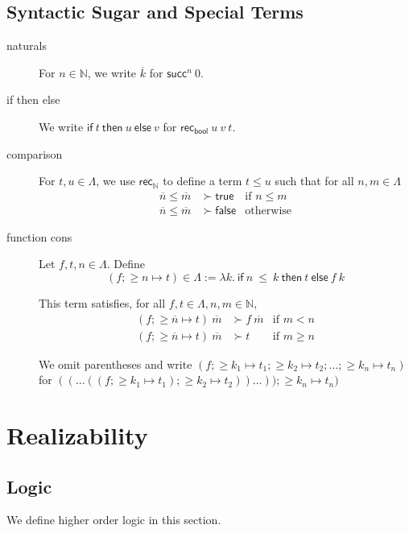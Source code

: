 \documentclass{article}
\newcommand{\successor}{\mathsf{succ}}
\newcommand{\N}{\mathbb{N}}
\newcommand{\recN}{\mathsf{rec}_{\mathbb{N}}}
\newcommand{\true}{\mathsf{true}}
\newcommand{\false}{\mathsf{false}}
\newcommand{\recbool}{\mathsf{rec_{bool}}}
\newcommand{\iif}{\mathsf{if}}
\newcommand{\eelse}{\mathsf{else}}
\newcommand{\tthen}{\mathsf{then}}
\begin{document}
\subsection{Syntactic Sugar and Special Terms}

\begin{description}
    \item[naturals] For $n \in \N$, we write $\overline{k}$ for $\successor^n\ 0$.
    \item[if then else] We write $\iif\ t\ \tthen\ u\ \eelse\ v$ for $\recbool\ u\ v\ t$.
    \item[comparison] For $t, u \in \Lambda$, we use $\recN$ to define a term $t \le u$ such that for all $n, m \in \Lambda$
    \begin{align*}
        \overline{n} \le \overline{m} & \succ \true & \text{if $n \le m$} \\
        \overline{n} \le \overline{m} & \succ \false & \text{otherwise}
    \end{align*}
    \item[function cons] Let $f, t, n \in \Lambda$. Define
    \[(f; \ge n \mapsto t) \in \Lambda := \lambda k.\ \iif\ n\ \le\ k\ \tthen\ t\ \eelse\ f\ k\]
    
    This term satisfies, for all $f, t \in \Lambda, n, m \in \N$,
    \begin{align*}
        (f; \ge \overline{n} \mapsto t)\ \overline{m} & \succ f\ \overline{m} & \text{if $m < n$} \\
        (f; \ge \overline{n} \mapsto t)\ \overline{m} & \succ t & \text{if $m \ge n$}
    \end{align*}

    We omit parentheses and write $(f; \ge k_1 \mapsto t_1; \ge k_2 \mapsto t_2; \dots; \ge k_n \mapsto t_n)$ for $((\dots((f; \ge k_1 \mapsto t_1); \ge k_2 \mapsto t_2))\dots)); \ge k_n \mapsto t_n)$
\end{description}

\section{Realizability}

\subsection{Logic}

We define higher order logic in this section.
\end{document}
